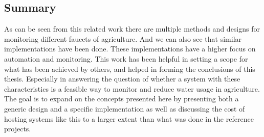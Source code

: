 \documentclass[]{uiophd}
\begin{document}
\subsection{Summary}
As can be seen from this related work there are multiple methods and designs for monitoring different faucets of agriculture. And we can also see that similar implementations have been done. These implementations have a higher focus on automation and monitoring. This work has been helpful in setting a scope for what has been achieved by others, and helped in forming the conclusions of this thesis. Especially in answering the question of whether a system with these characteristics is a feasible way to monitor and reduce water usage in agriculture. The goal is to expand on the concepts presented here by presenting both a generic design and a specific implementation as well as discussing the cost of hosting systems like this to a larger extent than what was done in the reference projects.
\end{document}
